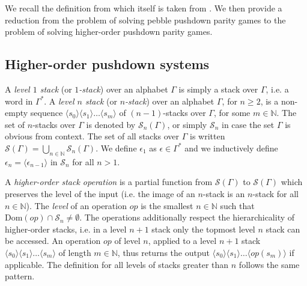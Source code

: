 \documentclass[a4paper,UKenglish,cleveref, autoref, thm-restate]{lipics-v2021}
\newcommand{\N}{\mathbb{N}}
\begin{document}
We recall the definition from \cite{cachat2007complexity} which itself is taken from \cite{knapik2002higher}. We then provide a
reduction from the problem of solving pebble pushdown parity games to the problem of solving
higher-order pushdown parity games.


\subsection{Higher-order pushdown systems}

A {\em level $1$ stack} (or {\em $1$-stack}) over an alphabet $\Gamma$ is 
simply a 
	stack over $\Gamma$, i.e. a word  in $\Gamma^*$.
A  {\em level $n$ stack} (or {\em $n$-stack}) over an alphabet $\Gamma$, for $n \geq 2$, is a 
non-empty sequence
$ \langle s_0 \rangle \langle s_1 \rangle \ldots \langle s_m \rangle$
of
$(n-1)$-stacks over $\Gamma$,
for some $m \in \N$.
The set of $n$-stacks over $\Gamma$ is denoted by $\mathscr{S}_n(\Gamma)$,
or simply $\mathscr{S}_n$ in case the set $\Gamma$ is obvious from context.
The set of all stacks over $\Gamma$ is written $\mathscr{S}(\Gamma) = \bigcup_{n\in \N} \mathscr{S}_n(\Gamma)$.
We define $\epsilon_{1}$ as
$\epsilon \in \Gamma^*$ and we inductively define 
$\epsilon_{n} = \langle \epsilon_{n-1} \rangle$ in $\mathscr{S}_n$ for all $n > 1$.




A {\em higher-order stack operation} is a partial function from $\mathscr{S}(\Gamma)$ 
to $\mathscr{S}(\Gamma)$ which preserves the level of the input (i.e. the image of
an $n$-stack is an $n$-stack for all $n \in \N$). The {\em level } of an operation $op$
is the smallest $n \in \N$ such that $\text{Dom}(op) \cap \mathscr{S}_n \neq \emptyset$. 
The operations 
additionally
 respect the hierarchicality of higher-order stacks, i.e. in
a level $n+1$ stack only the topmost level $n$ stack can be accessed. An operation
$op$ of level $n$, applied to a level $n+1$ stack 
$ \langle s_0 \rangle \langle s_1 \rangle \ldots \langle s_m \rangle$
of length $m \in \N$,
thus
returns the output
$ \langle s_0 \rangle \langle s_1 \rangle \ldots \langle op(s_m) \rangle$
if applicable.
The definition for  all levels of stacks greater than $n$ follows the same pattern.
\end{document}
